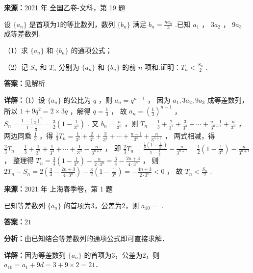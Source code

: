 \begin{question}[points=12]
\textbf{来源：}2021 年 全国乙卷-文科，第 19 题\par
设 $\{a_n\}$ 是首项为1的等比数列，数列 $\{b_n\}$ 满足 $b_n = \frac{na_n}{3}$ .已知 $a_1$ ， $3a_2$ ， $9a_3$ 成等差数列.

（1）求 $\{a_n\}$ 和 $\{b_n\}$ 的通项公式；

（2）记 $S_n$ 和 $T_n$ 分别为 $\{a_n\}$ 和 $\{b_n\}$ 的前 $n$ 项和.证明：$T_n < \frac{S_n}{2}$ .
\begin{solution}
\textbf{答案：}见解析

\textbf{详解：}（1）设 $\{a_n\}$ 的公比为 $q$ ，则 $a_n = q^{n-1}$ ，
因为 $a_1, 3a_2, 9a_3$ 成等差数列，所以 $1 + 9q^2 = 2\times 3q$ ，解得 $q = \frac{1}{3}$ ，
故 $a_n = \left(\frac{1}{3}\right)^{n-1}$ ， $S_n = \frac{1-\left(\frac{1}{3}\right)^n}{1-\frac{1}{3}} = \frac{3}{2}\left(1-\frac{1}{3^n}\right)$ .
又 $b_n = \frac{n}{3^n}$ ，则 $T_n = \frac{1}{3} + \frac{2}{3^2} + \frac{3}{3^3} + \cdots + \frac{n-1}{3^{n-1}} + \frac{n}{3^n}$ ，
两边同乘 $\frac{1}{3}$ ，得 $\frac{1}{3}T_n = \frac{1}{3^2} + \frac{2}{3^3} + \frac{3}{3^4} + \cdots + \frac{n-1}{3^n} + \frac{n}{3^{n+1}}$ ，
两式相减，得 $\frac{2}{3}T_n = \frac{1}{3} + \frac{1}{3^2} + \frac{1}{3^3} + \cdots + \frac{1}{3^n} - \frac{n}{3^{n+1}}$ ，
即 $\frac{2}{3}T_n = \frac{\frac{1}{3}(1-\frac{1}{3^n})}{1-\frac{1}{3}} - \frac{n}{3^{n+1}} = \frac{1}{2}(1-\frac{1}{3^n}) - \frac{n}{3^{n+1}}$ ，
整理得 $T_n = \frac{3}{4}(1-\frac{1}{3^n}) - \frac{n}{2\cdot3^n} = \frac{3}{4} - \frac{2n+3}{4\cdot3^n}$ ，
则 $2T_n - S_n = 2\left(\frac{3}{4} - \frac{2n+3}{4\cdot3^n}\right) - \frac{3}{2}\left(1-\frac{1}{3^n}\right) = -\frac{4n+3}{2\cdot3^n} < 0$ ，
故 $T_n < \frac{S_n}{2}$ .
\end{solution}
\end{question}

\begin{question}[points=4]
\textbf{来源：}2021 年 上海春季卷，第 1 题\par
已知等差数列 $\{a_n\}$ 的首项为3，公差为2，则 $a_{10}=$  .
\fillin[{$21$}]
\begin{solution}
\textbf{答案：}$21$

\textbf{分析：}由已知结合等差数列的通项公式即可直接求解．

\textbf{详解：}因为等差数列 $\{a_n\}$ 的首项为3，公差为2，则 $a_{10}=a_1+9d=3+9\times 2=21$．
\end{solution}
\end{question}

